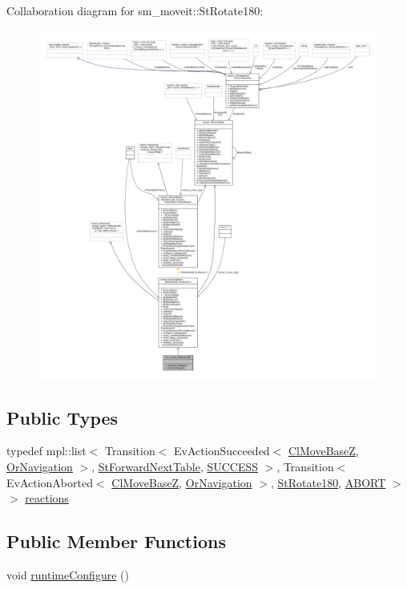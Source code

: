 Collaboration diagram for sm\+\_\+moveit\+:\+:St\+Rotate180\+:
\nopagebreak
\begin{figure}[H]
\begin{center}
\leavevmode
\includegraphics[width=350pt]{structsm__moveit_1_1StRotate180__coll__graph}
\end{center}
\end{figure}
\subsection*{Public Types}
\begin{DoxyCompactItemize}
\item 
typedef mpl\+::list$<$ Transition$<$ Ev\+Action\+Succeeded$<$ \hyperlink{classcl__move__base__z_1_1ClMoveBaseZ}{Cl\+Move\+BaseZ}, \hyperlink{classsm__moveit_1_1OrNavigation}{Or\+Navigation} $>$, \hyperlink{structsm__moveit_1_1StForwardNextTable}{St\+Forward\+Next\+Table}, \hyperlink{classSUCCESS}{S\+U\+C\+C\+E\+SS} $>$, Transition$<$ Ev\+Action\+Aborted$<$ \hyperlink{classcl__move__base__z_1_1ClMoveBaseZ}{Cl\+Move\+BaseZ}, \hyperlink{classsm__moveit_1_1OrNavigation}{Or\+Navigation} $>$, \hyperlink{structsm__moveit_1_1StRotate180}{St\+Rotate180}, \hyperlink{classABORT}{A\+B\+O\+RT} $>$ $>$ \hyperlink{structsm__moveit_1_1StRotate180_a1f3d4ae503a581dfffd91742b9c77610}{reactions}
\end{DoxyCompactItemize}
\subsection*{Public Member Functions}
\begin{DoxyCompactItemize}
\item 
void \hyperlink{structsm__moveit_1_1StRotate180_af424dc219c107d5c3678c6fc915d9c68}{runtime\+Configure} ()
\end{DoxyCompactItemize}
